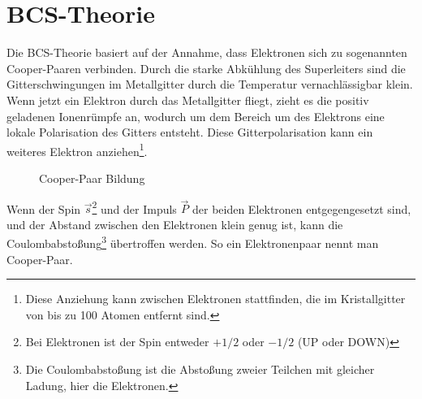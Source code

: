 \section{BCS-Theorie}
Die BCS-Theorie basiert auf der Annahme, dass Elektronen sich zu sogenannten Cooper-Paaren verbinden. 
Durch die starke Abkühlung des Superleiters sind die Gitterschwingungen im Metallgitter durch die Temperatur 
vernachlässigbar klein. Wenn jetzt ein Elektron durch das Metallgitter fliegt, zieht es die positiv geladenen
Ionenrümpfe an, wodurch um dem Bereich um des Elektrons eine lokale Polarisation des Gitters entsteht. Diese 
Gitterpolarisation kann ein weiteres Elektron anziehen\footnote{Diese Anziehung kann zwischen Elektronen stattfinden, die im Kristallgitter von bis zu 100 Atomen entfernt sind.}. 

\begin{figure}[!ht]
    \centering
    \caption{Cooper-Paar Bildung}
    \label{fig:CooperPaar}
\end{figure}
Wenn der Spin $\vec{s}$\footnote{Bei Elektronen ist der Spin entweder $+1/2$ oder $-1/2$ (UP oder DOWN)} und der Impuls $\vec{P}$ der beiden Elektronen entgegengesetzt sind, und der 
Abstand zwischen den Elektronen klein genug ist, kann die Coulombabstoßung\footnote{Die Coulombabstoßung ist die Abstoßung zweier Teilchen mit gleicher Ladung, hier die Elektronen.} übertroffen werden. So ein Elektronenpaar nennt man
Cooper-Paar. 

